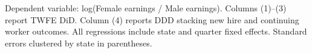 \begin{table}[htbp]
   \par \raggedright 
   Dependent variable: log(Female earnings / Male earnings). Columns (1)--(3) report TWFE DiD. Column (4) reports DDD stacking new hire and continuing worker outcomes. All regressions include state and quarter fixed effects. Standard errors clustered by state in parentheses.
\end{table}


